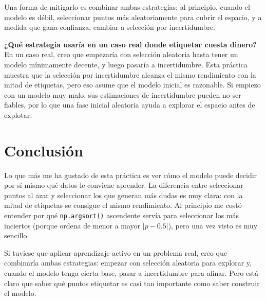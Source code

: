 \documentclass[../../__memoria.tex]{subfiles}
\begin{document}
Una forma de mitigarlo es combinar ambas estrategias: al principio, cuando el modelo es débil, seleccionar puntos más aleatoriamente para cubrir el espacio, y a medida que gana confianza, cambiar a selección por incertidumbre.

\vspace{0.3cm}

\textbf{¿Qué estrategia usaría en un caso real donde etiquetar cuesta dinero?} \\
En un caso real, creo que empezaría con selección aleatoria hasta tener un modelo mínimamente decente, y luego pasaría a incertidumbre. Esta práctica muestra que la selección por incertidumbre alcanza el mismo rendimiento con la mitad de etiquetas, pero eso asume que el modelo inicial es razonable. Si empiezo con un modelo muy malo, sus estimaciones de incertidumbre pueden no ser fiables, por lo que una fase inicial aleatoria ayuda a explorar el espacio antes de explotar.

\section*{Conclusión}

Lo que más me ha gustado de esta práctica es ver cómo el modelo puede decidir por sí mismo qué datos le conviene aprender. La diferencia entre seleccionar puntos al azar y seleccionar los que generan más dudas es muy clara: con la mitad de etiquetas se consigue el mismo rendimiento. Al principio me costó entender por qué \texttt{np.argsort()} ascendente servía para seleccionar los más inciertos (porque ordena de menor a mayor $|p-0.5|$), pero una vez visto es muy sencillo.

Si tuviese que aplicar aprendizaje activo en un problema real, creo que combinaría ambas estrategias: empezar con selección aleatoria para explorar y, cuando el modelo tenga cierta base, pasar a incertidumbre para afinar. Pero está claro que saber qué puntos etiquetar es casi tan importante como saber construir el modelo.

\vspace{3.0cm}
\end{document}
